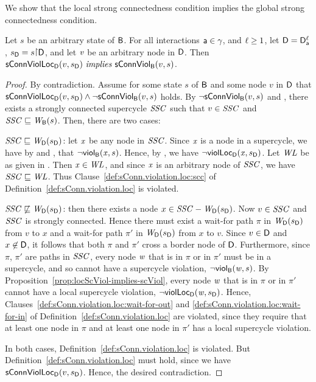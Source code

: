 We show that the local strong connectedness condition implies the global strong connectedness condition.

\begin{proposition}
\label{prop:locConnViol-implies-ConnViol}
 \label{prop:locConnViol-implies-connViol}
Let $s$ be an arbitrary state of $\B$.
For all interactions $\act \in \gamma$, and $\l \ge 1$, let $\DS = \dsks{\act}{\l}$, $\sD = s \pj \dsk{\act}{\l}$, and let $\ndv$ be an arbitrary node in $\dsk{\act}{\l}$.
Then\\
\ind $\locConnViol{v}{\sD}{\act}{\l}\ \impliess\ \connViol{v}{s}$.
\end{proposition}
%
\begin{proof}
By contradiction. Assume for some state $s$ of $\B$ and some node $v$ in $\dsk{a}{\l}$ that $\locConnViol{v}{\sD}{\act}{\l} \land \neg
\connViol{v}{s}$ holds.
By $\neg \connViol{v}{s}$ and , there exists a strongly connected
supercycle $\SSC$ such that $v \in \SSC$ and $\SSC \subg \wfg{\B}{s}$. Then, there are two cases:
%
\bn
\item $\SSC \subg \wfg{\dsk{a}{\l}}{\sD}$: let $\ndx$ be any node in $\SSC$. Since $\ndx$ is a node in a supercycle, we have by
   and , that $\neg \scV{\ndx}{s}$. 
   Hence, by ,  we have $\neg \scVL{\ndx}{\sD}{\act}{\l}$. 
   Let $\WL$ be as given in .
  Then $\ndx \in \WL$, and since $\ndx$ is an arbitrary node of $\SSC$, we have $\SSC \subg \WL$. 
  Thus Clause~\ref{def:sConn.violation.loc:scc} of Definition~\ref{def:sConn.violation.loc} is violated.

\item $\SSC \not\subg \wfg{\dsk{a}{\l}}{\sD}$: then there exists a node $x \in \SSC - \wfg{\dsk{a}{\l}}{\sD}$.
  Now $v \in \SSC$ and $\SSC$ is strongly connected. Hence there must exist a wait-for path $\pi$ in $\lwfg{\B}{\sD}{\DS}$
  from $v$ to $x$ and a wait-for path $\pi'$ in $\lwfg{\B}{\sD}{\DS}$ from $x$ to
  $v$. Since $v \in \dsk{a}{\l}$ and $x \not\in \dsk{a}{\l}$, it
  follows that both $\pi$ and $\pi'$  cross a border node of
  $\dsk{a}{\l}$. Furthermore, since $\pi$, $\pi'$ are paths in $\SSC$, every node $\ndw$ that is
  in $\pi$ or in $\pi'$ must be in a supercycle, and so cannot have a supercycle violation, \ie $\neg \scV{\ndw}{s}$. 
  By Proposition~\ref{prop:locScViol-implies-scViol}, every node $\ndw$ that is
  in $\pi$ or in $\pi'$ cannot have a local supercycle violation, \ie $\neg \scVL{\ndw}{\sD}{\act}{\l}$.
  Hence, Clauses~\ref{def:sConn.violation.loc:wait-for-out} and
  \ref{def:sConn.violation.loc:wait-for-in} of Definition~\ref{def:sConn.violation.loc} are violated,
  since they require that at least one node in $\pi$ and at least one node in $\pi'$ has a local supercycle violation.
  
\en
In both cases,  Definition~\ref{def:sConn.violation.loc} is violated. 
But  Definition~\ref{def:sConn.violation.loc} must hold, since we have $\locConnViol{v}{\sD}{\act}{\l}$. 
Hence, the desired contradiction.
\end{proof}



